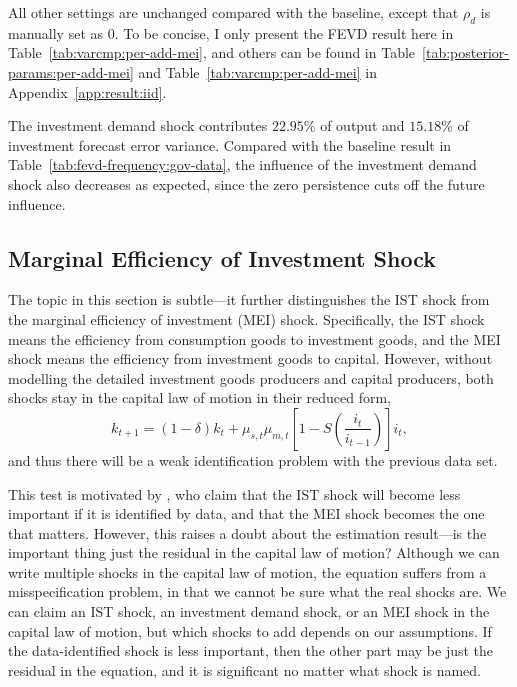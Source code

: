 All other settings are unchanged compared with the baseline, except that $\rho_d$ is manually set as $0$. To be concise, I only present the FEVD result here in Table~\ref{tab:varcmp:per-add-mei}, and others can be found in Table~\ref{tab:posterior-params:per-add-mei} and Table~\ref{tab:varcmp:per-add-mei} in Appendix~\ref{app:result:iid}.



The investment demand shock contributes $22.95\%$ of output and $15.18\%$ of investment forecast error variance. Compared with the baseline result in Table~\ref{tab:fevd-frequency:gov-data}, the influence of the investment demand shock also decreases as expected, since the zero persistence cuts off the future influence.

\subsection{Marginal Efficiency of Investment Shock}
\label{sec:robustness:mei}
The topic in this section is subtle---it further distinguishes the IST shock from the marginal efficiency of investment (MEI) shock. Specifically, the IST shock means the efficiency from consumption goods to investment goods, and the MEI shock means the efficiency from investment goods to capital. However, without modelling the detailed investment goods producers and capital producers, both shocks stay in the capital law of motion in their reduced form,
\begin{equation}\label{eq:mei}
    k_{t+1} = (1 - \delta) k_t + \mu_{s, t}\mu_{m, t}\left[1 - S\left(\frac{i_t}{i_{t-1}}\right)\right] i_t,
\end{equation}
and thus there will be a weak identification problem with the previous data set.

This test is motivated by \cite{justinianoInvestmentShocksRelative2011}, who claim that the IST shock will become less important if it is identified by data, and that the MEI shock becomes the one that matters. However, this raises a doubt about the estimation result---is the important thing just the residual in the capital law of motion? Although we can write multiple shocks in the capital law of motion, the equation suffers from a misspecification problem, in that we cannot be sure what the real shocks are. We can claim an IST shock, an investment demand shock, or an MEI shock in the capital law of motion, but which shocks to add depends on our assumptions. If the data-identified shock is less important, then the other part may be just the residual in the equation, and it is significant no matter what shock is named.

